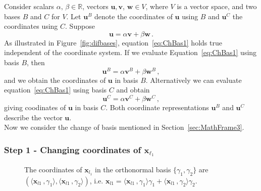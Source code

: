 \documentclass[letter,12pt]{article}
\begin{document}
{Consider scalars $\alpha, \, \beta \in \mathbb{R}$,  vectors $\bm{u}, \bm{v}$, $\bm{w} \in V $, where $V$ is a vector space, and two bases $B$ and $C$ for $V$. Let $\bm{u}^{B}$ denote the coordinates of $\bm{u}$ using $B$ and $\bm{u}^{C}$ the coordinates using $C$. Suppose 
\begin{equation}\label{eq:ChBas1}
     \bm{u} = \alpha \bm{v} + \beta \bm{w} \, . 
\end{equation}
As illustrated in Figure~\ref{fig:difbases}, equation~\eqref{eq:ChBas1} holds true independent of the coordinate system. If we evaluate Equation~\eqref{eq:ChBas1} using basis $B$, then 
\begin{equation}\label{eq:ChBas2}
     \bm{u}^B = \alpha \bm{v}^B + \beta \bm{w}^B \, , 
\end{equation}
and we obtain the coordinates of $\bm{u}$ in basis $B$. Alternatively we can evaluate equation~\eqref{eq:ChBas1} using basis $C$ and obtain 
\begin{equation}\label{eq:ChBas3}
     \bm{u}^C = \alpha \bm{v}^C + \beta \bm{w}^C \, , 
\end{equation}
giving coodinates of $\bm{u}$ in basis $C$. Both coordinate representations $\bm{u}^B$ and $\bm{u}^C$ describe the vector  $\bm{u}$.  \\

Now we consider the change of basis mentioned in Section~\ref{sec:MathFrame3}. 

\subsubsection{Step 1 - Changing coordinates of $\bm{x}_{\ell_1}$ }
\begin{figure}
    \centering
    \caption{\color{blue} The coordinates of $\bm{x}_{l_1}$ in the orthonormal basis $\{\gamma_1, \gamma_2\}$ are $\left( \langle \bm{x}_{l1}\, ,  \gamma_{1} \rangle, \langle \bm{x}_{l1}\, ,  \gamma_{2} \rangle \right)$, i.e. $\bm{x}_{l1} = \langle \bm{x}_{l1}\, ,  \gamma_{1} \rangle \gamma_1 + \langle \bm{x}_{l1}\, ,  \gamma_{2} \rangle \gamma_2$.    }
    \label{fig:dotprodcoords}
\end{figure}


}
\end{document}
